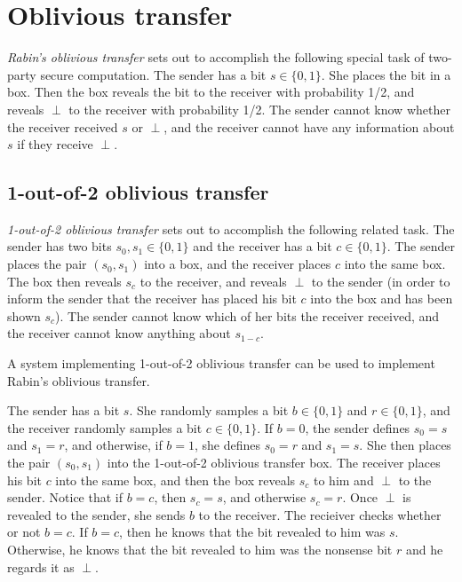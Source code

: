 \section{Oblivious transfer}

\emph{Rabin's oblivious transfer} sets out to accomplish the following special task of two-party secure computation. The sender has a bit $s \in \{0,1\}$. She places the bit in a box. Then the box reveals the bit to the receiver with probability 1/2, and reveals $\perp$ to the receiver with probability 1/2. The sender cannot know whether the receiver received $s$ or $\perp$, and the receiver cannot have any information about $s$ if they receive $\perp$.

\subsection{1-out-of-2 oblivious transfer}
\emph{1-out-of-2 oblivious transfer} sets out to accomplish the following related task. The sender has two bits $s_0, s_1 \in \{0,1\}$ and the receiver has a bit $c \in \{0,1\}$. The sender places the pair $(s_0, s_1)$ into a box, and the receiver places $c$ into the same box. The box then reveals $s_c$ to the receiver, and reveals $\perp$ to the sender (in order to inform the sender that the receiver has placed his bit $c$ into the box and has been shown $s_c$). The sender cannot know which of her bits the receiver received, and the receiver cannot know anything about $s_{1-c}$.

\begin{lemma}
A system implementing 1-out-of-2 oblivious transfer can be used to implement Rabin's oblivious transfer.
\end{lemma}

\proof
The sender has a bit $s$. She randomly samples a bit $b \in \{0,1\}$ and $r \in \{0,1\}$, and the receiver randomly samples a bit $c \in \{0,1\}$. If $b = 0$, the sender defines $s_0 = s$ and $s_1 = r$, and otherwise, if $b = 1$, she defines $s_0 = r$ and $s_1 = s$. She then places the pair $(s_0, s_1)$ into the 1-out-of-2 oblivious transfer box. The receiver places his bit $c$ into the same box, and then the box reveals $s_c$ to him and $\perp$ to the sender. Notice that if $b = c$, then $s_c = s$, and otherwise $s_c = r$. Once $\perp$ is revealed to the sender, she sends $b$ to the receiver. The recieiver checks whether or not $b = c$. If $b = c$, then he knows that the bit revealed to him was $s$. Otherwise, he knows that the bit revealed to him was the nonsense bit $r$ and he regards it as $\perp$. \\

